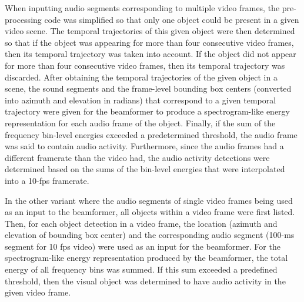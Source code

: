 When inputting audio segments corresponding to multiple video frames, the pre-processing code was simplified so that only one object could be present in a given video scene. The temporal trajectories of this given object were then determined so that if the object was appearing for more than four consecutive video frames, then its temporal trajectory was taken into account. If the object did not appear for more than four consecutive video frames, then its temporal trajectory was discarded. After obtaining the temporal trajectories of the given object in a scene, the sound segments and the frame-level bounding box centers (converted into azimuth and elevation in radians) that correspond to a given temporal trajectory were given for the beamformer to produce a spectrogram-like energy representation for each audio frame of the object. Finally, if the sum of the frequency bin-level energies exceeded a predetermined threshold, the audio frame was said to contain audio activity. Furthermore, since the audio frames had a different framerate than the video had, the audio activity detections were determined based on the sums of the bin-level energies that were interpolated into a 10-fps framerate.

In the other variant where the audio segments of single video frames being used as an input to the beamformer, all objects within a video frame were first listed. Then, for each object detection in a video frame, the location (azimuth and elevation of bounding box center) and the corresponding audio segment (100-ms segment for 10 fps video) were used as an input for the beamformer. For the spectrogram-like energy representation produced by the beamformer, the total energy of all frequency bins was summed. If this sum exceeded a predefined threshold, then the visual object was determined to have audio activity in the given video frame.

